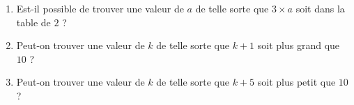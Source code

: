 
\begin{exercice}\label{exo2smath-0194}

    \begin{enumerate}
        \item
            Est-il possible de trouver une valeur de \( a\) de telle sorte que \( 3\times a\) soit dans la table de \( 2\) ?
        \item
            Peut-on trouver une valeur de \( k\) de telle sorte que \( k+1\) soit plus grand que \( 10\) ?
        \item
            Peut-on trouver une valeur de \( k\) de telle sorte que \( k+5\) soit plus petit que \( 10\) ?
    \end{enumerate}

\end{exercice}
